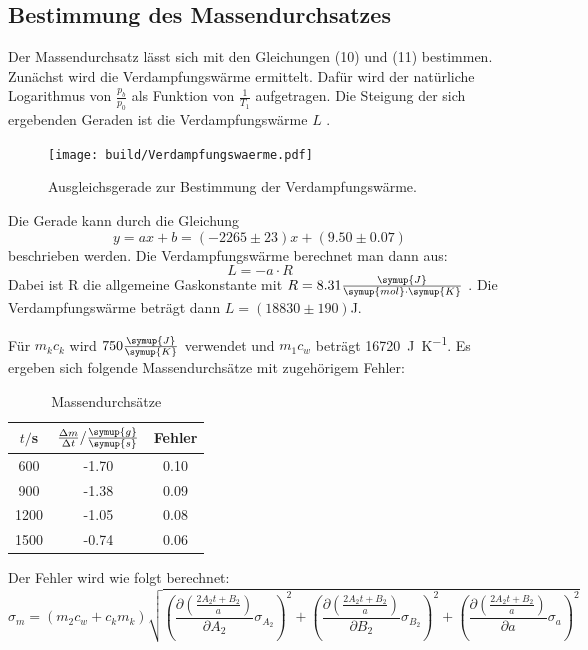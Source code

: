 \subsection{Bestimmung des Massendurchsatzes}
Der Massendurchsatz lässt sich mit den Gleichungen (10) und (11) bestimmen. Zunächst
wird die Verdampfungswärme ermittelt. Dafür wird der natürliche Logarithmus von
$\frac{p_b}{p_0}$ als Funktion von $\frac{1}{T_1}$ aufgetragen. Die Steigung der sich ergebenden
Geraden ist die Verdampfungswärme $L$ \cite{sample2}.
\begin{figure}[H]
  \centering
  \texttt{[image: build/Verdampfungswaerme.pdf]}
  \caption{Ausgleichsgerade zur Bestimmung der Verdampfungswärme.}
  \label{fig:Verdampfungswaerme}
\end{figure}
Die Gerade kann durch die Gleichung
\begin{equation}
  y = ax + b = (-2265 \pm 23)x + (9.50 \pm 0.07)
\end{equation}
beschrieben werden.
Die Verdampfungswärme berechnet man dann aus:
\begin{equation}
  L = -a \cdot R
\end{equation}
Dabei ist R die allgemeine Gaskonstante mit $R = 8.31 \frac{\symup{J}}{\symup{mol} \cdot \symup{K}}$ \cite{sample3}.
Die Verdampfungswärme beträgt dann $L = (18830 \pm 190)$J.

Für $m_kc_k$ wird $750 \frac{\symup{J}}{\symup{K}}$ verwendet und $m_1c_w$ beträgt \SI{16720}{\joule\per\kelvin}.
Es ergeben sich folgende Massendurchsätze mit zugehörigem Fehler:
\begin{table}[H]
  \centering
  \caption{Massendurchsätze}
  \label{tab:Massendurchsätze}
  \begin{tabular}{c c c}
    \toprule
    $t/$s &$\frac{\Delta m}{\Delta t}/\frac{\symup{g}}{\symup{s}}$ & Fehler \\
    \midrule
      600 & -1.70 & 0.10 \\
      900 & -1.38 & 0.09 \\
     1200 & -1.05 & 0.08 \\
     1500 & -0.74 & 0.06 \\
    \bottomrule
  \end{tabular}
\end{table}

Der Fehler wird wie folgt berechnet:
\begin{equation}
  \sigma_m = (m_2c_w + c_km_k)\sqrt{
      \left( \frac{\partial \left(\frac{2A_2t + B_2}{a}\right)}{\partial A_2} \sigma_{A_2} \right)^{\!\! 2} +
      \left( \frac{\partial \left(\frac{2A_2t + B_2}{a}\right)}{\partial B_2} \sigma_{B_2} \right)^{\!\! 2} +
      \left( \frac{\partial \left(\frac{2A_2t + B_2}{a}\right)}{\partial a} \sigma_{a} \right)^{\!\! 2}
    }
\end{equation}

